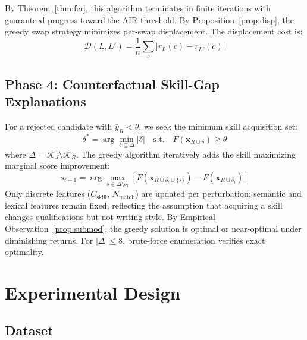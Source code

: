 \documentclass{llncs}
\begin{document}
By Theorem~\ref{thm:fcr}, this algorithm terminates in finite iterations with guaranteed progress toward the AIR threshold. By Proposition~\ref{prop:disp}, the greedy swap strategy minimizes per-swap displacement. The displacement cost is:
\begin{equation}
    \mathcal{D}(L, L') = \frac{1}{n}\sum_{c} |r_L(c) - r_{L'}(c)|
\end{equation}

\subsection{Phase 4: Counterfactual Skill-Gap Explanations}

For a rejected candidate with $\hat{y}_R < \theta$, we seek the minimum skill acquisition set:
\begin{equation}
    \delta^* = \arg\min_{\delta \subseteq \Delta} |\delta| \quad \text{s.t.} \quad F(\mathbf{x}_{R \cup \delta}) \geq \theta
\end{equation}
where $\Delta = \mathcal{K}_J \setminus \mathcal{K}_R$. The greedy algorithm iteratively adds the skill maximizing marginal score improvement:
\begin{equation}
    s_{t+1} = \arg\max_{s \in \Delta \setminus \delta_t} \left[ F(\mathbf{x}_{R \cup \delta_t \cup \{s\}}) - F(\mathbf{x}_{R \cup \delta_t}) \right]
\end{equation}
Only discrete features ($C_\text{skill}$, $N_\text{match}$) are updated per perturbation; semantic and lexical features remain fixed, reflecting the assumption that acquiring a skill changes qualifications but not writing style. By Empirical Observation~\ref{prop:submod}, the greedy solution is optimal or near-optimal under diminishing returns. For $|\Delta| \leq 8$, brute-force enumeration verifies exact optimality.

\section{Experimental Design}\label{sec:experiment}

\subsection{Dataset}
\end{document}

